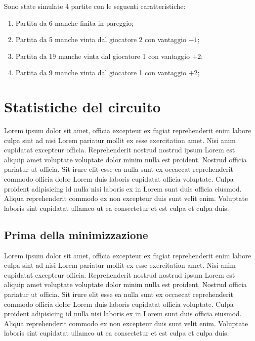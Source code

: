 \documentclass[a4paper]{article}
\begin{document}
\noindent Sono state simulate 4 partite con le seguenti caratteristiche:
\begin{enumerate}
	\item Partita da 6 manche finita in pareggio;
	\item Partita da 5 manche vinta dal giocatore 2 con vantaggio \( -1 \);
	\item Partita da 19 manche vinta dal giocatore 1 con vantaggio \( +2 \);
	\item Partita da 9 manche vinta dal giocatore 1 con vantaggio \( +2 \);
\end{enumerate}

\section{Statistiche del circuito}
Lorem ipsum dolor sit amet, officia excepteur ex fugiat reprehenderit enim labore culpa sint ad nisi Lorem pariatur mollit ex esse exercitation amet. Nisi anim cupidatat excepteur officia. Reprehenderit nostrud nostrud ipsum Lorem est aliquip amet voluptate voluptate dolor minim nulla est proident. Nostrud officia pariatur ut officia. Sit irure elit esse ea nulla sunt ex occaecat reprehenderit commodo officia dolor Lorem duis laboris cupidatat officia voluptate. Culpa proident adipisicing id nulla nisi laboris ex in Lorem sunt duis officia eiusmod. Aliqua reprehenderit commodo ex non excepteur duis sunt velit enim. Voluptate laboris sint cupidatat ullamco ut ea consectetur et est culpa et culpa duis.

\subsection{Prima della minimizzazione}
Lorem ipsum dolor sit amet, officia excepteur ex fugiat reprehenderit enim labore culpa sint ad nisi Lorem pariatur mollit ex esse exercitation amet. Nisi anim cupidatat excepteur officia. Reprehenderit nostrud nostrud ipsum Lorem est aliquip amet voluptate voluptate dolor minim nulla est proident. Nostrud officia pariatur ut officia. Sit irure elit esse ea nulla sunt ex occaecat reprehenderit commodo officia dolor Lorem duis laboris cupidatat officia voluptate. Culpa proident adipisicing id nulla nisi laboris ex in Lorem sunt duis officia eiusmod. Aliqua reprehenderit commodo ex non excepteur duis sunt velit enim. Voluptate laboris sint cupidatat ullamco ut ea consectetur et est culpa et culpa duis.
\end{document}
